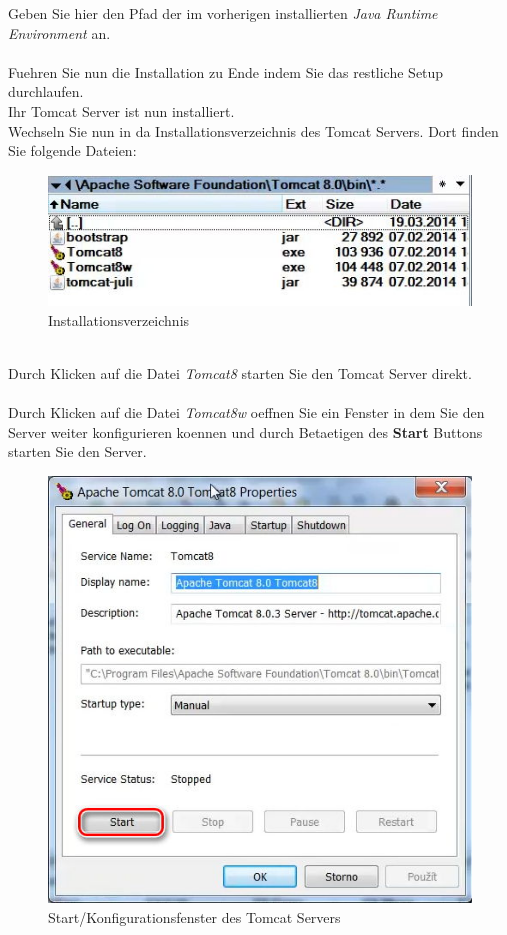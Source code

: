 \documentclass[a4paper, 12pt]{scrreprt}
\begin{document}
Geben Sie hier den Pfad der im vorherigen installierten {\it Java Runtime Environment} an.\\
\ \\
Fuehren Sie nun die Installation zu Ende indem Sie das restliche Setup durchlaufen.\\
Ihr Tomcat Server ist nun installiert.
\ \\
Wechseln Sie nun in da Installationsverzeichnis des Tomcat Servers. Dort finden Sie folgende Dateien:
\begin{figure}[h]
\centering
\includegraphics[width=0.8\linewidth]{Grafiken/TomcatDirectory}
\caption{Installationsverzeichnis}
\label{fig:TomcatDirectory}
\end{figure}\\
Durch Klicken auf die Datei {\it Tomcat8} starten Sie den Tomcat Server direkt.\\
\newpage
\ \\
Durch Klicken auf die Datei {\it Tomcat8w} oeffnen Sie ein Fenster in dem Sie den Server weiter konfigurieren koennen und durch 
Betaetigen des \textbf{Start} Buttons starten Sie den Server.
\begin{figure}[h]
\centering
\includegraphics[width=0.8\linewidth]{Grafiken/TomcatStartup}
\caption{Start/Konfigurationsfenster des Tomcat Servers}
\label{fig:TomcatStartup}
\end{figure}
\end{document}
